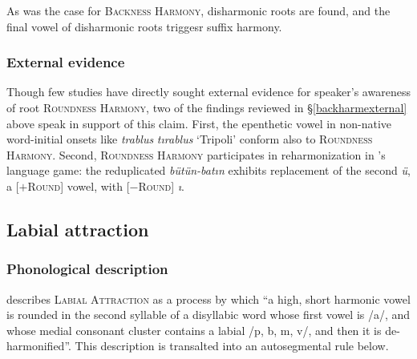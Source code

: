 \noindent As was the case for \textsc{Backness Harmony}, disharmonic roots are found, and the final vowel of disharmonic roots triggesr suffix harmony.

\subsubsection{External evidence}

Though few studies have directly sought external evidence for speaker's awareness of root \textsc{Roundness Harmony}, two of the findings reviewed in \S\ref{backharmexternal} above speak in support of this claim. First, the epenthetic vowel in non-native word-initial onsets
like \emph{trablus} \alt{} \emph{tırablus} `Tripoli' conform also to \textsc{Roundness Harmony}.
Second, \textsc{Roundness Harmony} participates in reharmonization in \citeauthor{Harrison2001}'s language game: the reduplicated \emph{bütün-batın} exhibits replacement of the second \emph{ü}, a [$+$\textsc{Round}] vowel, with [$-$\textsc{Round}] \emph{ı}.

\subsection{Labial attraction}


\subsubsection{Phonological description}

\citet[][36]{Lees1966a} describes \textsc{Labial Attraction} as a process by which ``a high, short harmonic vowel is rounded in the second syllable of a disyllabic word whose first vowel is /a/, and whose medial consonant cluster contains a labial /p, b, m, v/, and then it is de-harmonified''. This description is transalted into an autosegmental rule below.


